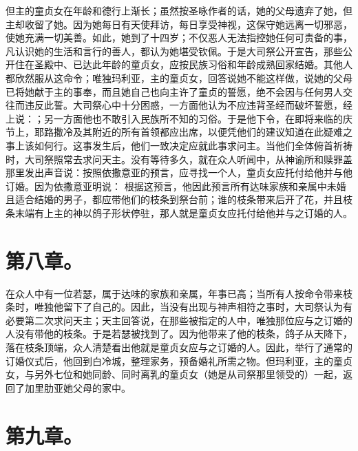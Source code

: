 但主的童贞女在年龄和德行上渐长；虽然按圣咏作者的话，她的父母遗弃了她，但主却收留了她。因为她每日有天使拜访，每日享受神视，这保守她远离一切邪恶，使她充满一切美善。如此，她到了十四岁；不仅恶人无法指控她任何可责备的事，凡认识她的生活和言行的善人，都认为她堪受钦佩。于是大司祭公开宣告，那些公开住在圣殿中、已达此年龄的童贞女，应按民族习俗和年龄成熟回家结婚。其他人都欣然服从这命令；唯独玛利亚，主的童贞女，回答说她不能这样做，说她的父母已将她献于主的事奉，而且她自己也向主许了童贞的誓愿，绝不会因与任何男人交往而违反此誓。大司祭心中十分困惑，一方面他认为不应违背圣经而破坏誓愿，经上说：；另一方面他也不敢引入民族所不知的习俗。于是他下令，在即将来临的庆节上，耶路撒冷及其附近的所有首领都应出席，以便凭他们的建议知道在此疑难之事上该如何行。这事发生后，他们一致决定应就此事求问主。当他们全体俯首祈祷时，大司祭照常去求问天主。没有等待多久，就在众人听闻中，从神谕所和赎罪盖那里发出声音说：按照依撒意亚的预言，应寻找一个人，童贞女应托付给他并与他订婚。因为依撒意亚明说：  根据这预言，他因此预言所有达味家族和亲属中未婚且适合结婚的男子，都应带他们的枝条到祭台前；谁的枝条带来后开了花，并且枝条末端有上主的神以鸽子形状停驻，那人就是童贞女应托付给他并与之订婚的人。\par


\section{第八章。}

在众人中有一位若瑟，属于达味的家族和亲属，年事已高；当所有人按命令带来枝条时，唯独他留下了自己的。因此，当没有出现与神声相符之事时，大司祭认为有必要第二次求问天主；天主回答说，在那些被指定的人中，唯独那位应与之订婚的人没有带他的枝条。于是若瑟被找到了。因为他带来了他的枝条，鸽子从天降下，落在枝条顶端，众人清楚看出他就是童贞女应与之订婚的人。因此，举行了通常的订婚仪式后，他回到白冷城，整理家务，预备婚礼所需之物。但玛利亚，主的童贞女，与另外七位和她同龄、同时离乳的童贞女（她是从司祭那里领受的）一起，返回了加里肋亚她父母的家中。\par


\section{第九章。}

